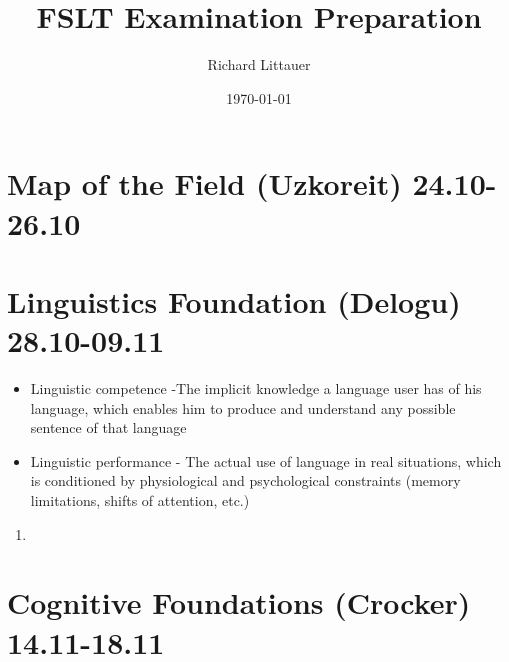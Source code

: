 \documentclass[11pt]{article}
\title{FSLT Examination Preparation}
\author{Richard Littauer}		%
\date{\today}                          		%
\begin{document}
\maketitle


\section{Map of the Field (Uzkoreit) 24.10-26.10}

\section{Linguistics Foundation (Delogu) 28.10-09.11}
\begin{itemize}{}{$\bullet$}
 \item Linguistic competence -The implicit knowledge a language user has of his language, which enables him to produce and understand any possible sentence of that language
 \item Linguistic performance - The actual use of language in real situations, which is conditioned by physiological and psychological constraints (memory limitations, shifts of attention, etc.)
\end{itemize}

\begin{enumerate}
 \item
\end{enumerate}
\section{ Cognitive Foundations (Crocker) 14.11-18.11}
\end{document}
